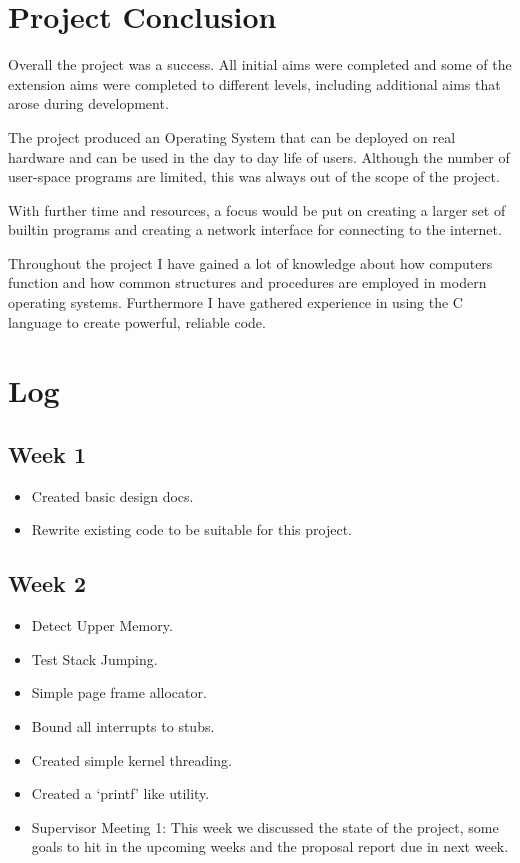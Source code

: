 \documentclass[a4paper]{report}
\begin{document}
\chapter{Project Conclusion}

Overall the project was a success. All initial aims were completed and some of the extension aims were completed to different levels, including additional aims that arose during development.

The project produced an Operating System that can be deployed on real hardware and can be used in the day to day life of users. Although the number of user-space programs are limited, this was always out of the scope of the project.

With further time and resources, a focus would be put on creating a larger set of builtin programs and creating a network interface for connecting to the internet.

Throughout the project I have gained a lot of knowledge about how computers function and how common structures and procedures are employed in modern operating systems. Furthermore I have gathered experience in using the C language to create powerful, reliable code.



\chapter{Log}


\section*{Week 1}
\begin{itemize}
\item Created basic design docs.
\item Rewrite existing code to be suitable for this project.
\end{itemize}

\section*{Week 2}
\begin{itemize}
\item Detect Upper Memory.
\item Test Stack Jumping.
\item Simple page frame allocator.
\item Bound all interrupts to stubs.
\item Created simple kernel threading.
\item Created a `printf' like utility.
\item Supervisor Meeting 1: This week we discussed the state of the project, some goals to hit in the upcoming weeks and the proposal report due in next week.
\end{itemize}
\end{document}
